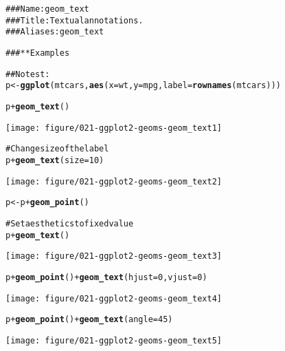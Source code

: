 \documentclass[a4paper,titlepage]{tufte-handout}\usepackage{graphicx, color}
\makeatletter
\def\maxwidth{ %
  \ifdim\Gin@nat@width>\linewidth
    \linewidth
  \else
    \Gin@nat@width
  \fi
}
\newcommand{\hlfunctioncall}[1]{\textcolor[rgb]{0.501960784313725,0,0.329411764705882}{\textbf{#1}}}%
\newcommand{\hlcomment}[1]{\textcolor[rgb]{0.180392156862745,0.6,0.341176470588235}{#1}}%
\newenvironment{kframe}{%
 \def\at@end@of@kframe{}%
 \ifinner\ifhmode%
  \def\at@end@of@kframe{\end{minipage}}%
  \begin{minipage}{\columnwidth}%
 \fi\fi%
 \def\FrameCommand##1{\hskip\@totalleftmargin \hskip-\fboxsep
 \colorbox{shadecolor}{##1}\hskip-\fboxsep
     \hskip-\linewidth \hskip-\@totalleftmargin \hskip\columnwidth}%
 \MakeFramed {\advance\hsize-\width
   \@totalleftmargin\z@ \linewidth\hsize
   \@setminipage}}%
 {\par\unskip\endMakeFramed%
 \at@end@of@kframe}
\newenvironment{knitrout}{}{} %
\makeatother
\begin{document}
\begin{knitrout}
\color{fgcolor}\begin{kframe}
\begin{alltt}
\hlcomment{### Name: geom_text}
\hlcomment{### Title: Textual annotations.}
\hlcomment{### Aliases: geom_text}

\hlcomment{### ** Examples}

\hlcomment{## No test: }
p <- \hlfunctioncall{ggplot}(mtcars, \hlfunctioncall{aes}(x=wt, y=mpg, label=\hlfunctioncall{rownames}(mtcars)))

p + \hlfunctioncall{geom_text}()
\end{alltt}
\end{kframe}
\texttt{[image: figure/021-ggplot2-geoms-geom\_text1]} 
\begin{kframe}\begin{alltt}
\hlcomment{# Change size of the label}
p + \hlfunctioncall{geom_text}(size=10)
\end{alltt}
\end{kframe}
\texttt{[image: figure/021-ggplot2-geoms-geom\_text2]} 
\begin{kframe}\begin{alltt}
p <- p + \hlfunctioncall{geom_point}()

\hlcomment{# Set aesthetics to fixed value}
p + \hlfunctioncall{geom_text}()
\end{alltt}
\end{kframe}
\texttt{[image: figure/021-ggplot2-geoms-geom\_text3]} 
\begin{kframe}\begin{alltt}
p + \hlfunctioncall{geom_point}() + \hlfunctioncall{geom_text}(hjust=0, vjust=0)
\end{alltt}
\end{kframe}
\texttt{[image: figure/021-ggplot2-geoms-geom\_text4]} 
\begin{kframe}\begin{alltt}
p + \hlfunctioncall{geom_point}() + \hlfunctioncall{geom_text}(angle = 45)
\end{alltt}
\end{kframe}
\texttt{[image: figure/021-ggplot2-geoms-geom\_text5]} 
\begin{kframe}\begin{alltt}


\end{alltt}
\end{kframe}
\end{knitrout}
\end{document}

